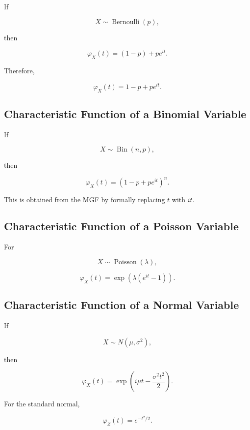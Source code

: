 If

\[
X\sim\operatorname{Bernoulli}(p),
\]

then

\[
\varphi_X(t)
=
(1-p)+pe^{it}.
\]

Therefore,

\[
\boxed{
\varphi_X(t)
=
1-p+pe^{it}.
}
\]

\subsection{Characteristic Function of a Binomial Variable}
\label{subsec:cf-binomial}

If

\[
X\sim\operatorname{Bin}(n,p),
\]

then

\[
\boxed{
\varphi_X(t)
=
(1-p+pe^{it})^n.
}
\]

This is obtained from the MGF by formally replacing \(t\) with \(it\).

\subsection{Characteristic Function of a Poisson Variable}
\label{subsec:cf-poisson}

For

\[
X\sim\operatorname{Poisson}(\lambda),
\]

\[
\boxed{
\varphi_X(t)
=
\exp
\left(
\lambda(e^{it}-1)
\right).
}
\]

\subsection{Characteristic Function of a Normal Variable}
\label{subsec:cf-normal}

If

\[
X\sim N(\mu,\sigma^2),
\]

then

\[
\boxed{
\varphi_X(t)
=
\exp
\left(
i\mu t
-
\frac{\sigma^2t^2}{2}
\right).
}
\]

For the standard normal,

\[
\boxed{
\varphi_Z(t)
=
e^{-t^2/2}.
}
\]

